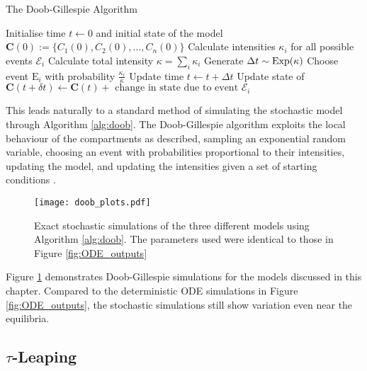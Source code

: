 \begin{algorithm}[htbp]
    \caption[{
        The Doob-Gillespie Algorithm
    }]{
        The Doob-Gillespie Algorithm \parencite{gillespie_exact_1977}
        }\label{alg:doob}
    \begin{algorithmic}
        \State Initialise time $t \gets 0$ and initial state of the model $\mathbf{C}(0) := \{C_1(0), C_2(0), \dots, C_n(0)\}$
        \State Calculate intensities $\kappa_i$ for all possible events $\mathcal{E}_i$
        \State Calculate total intensity $\kappa = \sum_i \kappa_i$
        \State Generate $\Delta t \sim \operatorname{Exp}(\kappa)$
        \State Choose event $\mathrm{E}_i$ with probability $\frac{\kappa_i}{\kappa}$
        \State Update time $t \gets t + \Delta t$
        \State Update state of $\mathbf{C}(t + \delta t) \gets \mathbf{C}(t) + \text{ change in state due to event } \mathcal{E}_i$
        \EndWhile
    \end{algorithmic}
\end{algorithm}

This leads naturally to a standard method of simulating the stochastic 
model through Algorithm \ref{alg:doob}. 
The Doob-Gillespie algorithm 
exploits the local behaviour of the compartments as described, sampling
an exponential random variable, choosing an event with probabilities 
proportional to their intensities, updating the model, and updating the 
intensities given a 
set of starting conditions \parencite{gillespie_exact_1977}.

\begin{figure}[htbp]
    \texttt{[image: doob\_plots.pdf]}
    \caption[{
        $SIS$, $SI$ with demography, and $SEIR$ Doob-Gillespie
        model simulations
    }]{
        Exact stochastic simulations of the three different models using 
        Algorithm \ref{alg:doob}. The parameters used were identical to 
        those in Figure \ref{fig:ODE_outputs}}
        \label{fig:doob_outputs}
\end{figure}

Figure \ref{fig:doob_outputs} demonstrates Doob-Gillespie simulations for the
models discussed in this chapter. Compared to the deterministic ODE simulations
in Figure \ref{fig:ODE_outputs}, the stochastic simulations still show variation
even near the equilibria.

\subsection*{\texorpdfstring{$\tau$}{Lg}-Leaping}

